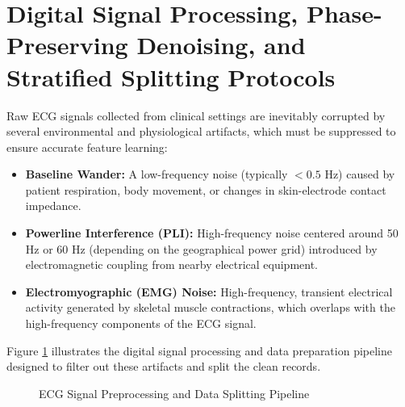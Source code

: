 \documentclass[12pt,a4paper]{report}
\begin{document}
\section{Digital Signal Processing, Phase-Preserving Denoising, and Stratified Splitting Protocols}
Raw ECG signals collected from clinical settings are inevitably corrupted by several environmental and physiological artifacts, which must be suppressed to ensure accurate feature learning:
\begin{itemize}
    \item \textbf{Baseline Wander:} A low-frequency noise (typically $<0.5$ Hz) caused by patient respiration, body movement, or changes in skin-electrode contact impedance.
    \item \textbf{Powerline Interference (PLI):} High-frequency noise centered around 50 Hz or 60 Hz (depending on the geographical power grid) introduced by electromagnetic coupling from nearby electrical equipment.
    \item \textbf{Electromyographic (EMG) Noise:} High-frequency, transient electrical activity generated by skeletal muscle contractions, which overlaps with the high-frequency components of the ECG signal.
\end{itemize}

Figure \ref{fig:preprocessing_pipeline} illustrates the digital signal processing and data preparation pipeline designed to filter out these artifacts and split the clean records.

\begin{figure}[H]
\centering
{}
\caption{ECG Signal Preprocessing and Data Splitting Pipeline}
\label{fig:preprocessing_pipeline}
\end{figure}
\end{document}
